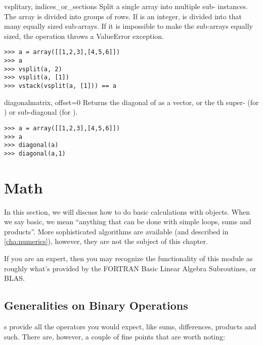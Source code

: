 \begin{funcdesc}{vsplit}{ary, indices_or_sections}
  Split a single  array into multiple sub-
  instances.  The array is divided into groups of rows.  If
   is an integer,  is divided into that
  many equally sized sub-arrays.  If it is impossible to make the sub-arrays
  equally sized, the operation throws a ValueError exception. 
  
\begin{verbatim}
>>> a = array([[1,2,3],[4,5,6]])
>>> a
>>> vsplit(a, 2)
>>> vsplit(a, [1])
>>> vstack(vsplit(a, [1])) == a
\end{verbatim}
\end{funcdesc}

\begin{funcdesc}{diagonal}{matrix, offset=0}
  Returns the diagonal of  as a vector, or the th
  super- (for ) or sub-diagonal (for ).
\begin{verbatim}
>>> a = array([[1,2,3],[4,5,6]])
>>> a
>>> diagonal(a)
>>> diagonal(a,1)
\end{verbatim}
\end{funcdesc}
\section{ Math}
In this section, we will discuss how to do basic calculations with 
objects. When we say basic, we mean ``anything that can be done with simple
loops, sums and products''. More sophisticated algorithms are available
(and described in \ref{cha:numerics}), however, they are not the subject of this
chapter.

If you are an expert, then you may recognize the functionality of this 
module as roughly what's provided by the FORTRAN Basic Linear Algebra Subroutines,
or BLAS.
\subsection{Generalities on Binary Operations}
s provide all the operators you would expect, like sums,
differences, products and such. There are, however, a couple of fine points
that are worth noting:
